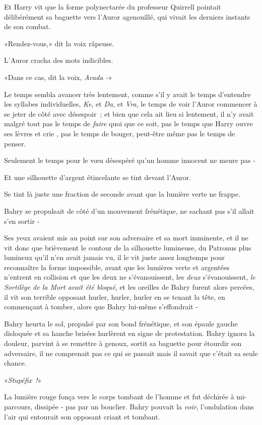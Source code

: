 Et Harry vit que la forme polynectarée du professeur Quirrell pointait délibérément sa baguette vers l'Auror agenouillé, qui vivait les derniers instants de son combat.

«Rendez-vous,» dit la voix râpeuse.

L'Auror cracha des mots indicibles.

«Dans ce cas, dit la voix, \emph{Avada -}»

Le temps sembla avancer très lentement, comme s'il y avait le temps d'entendre les syllabes individuelles, \emph{Ke}, et \emph{Da}, et \emph{Vra}, le temps de voir l'Auror commencer à se jeter de côté avec désespoir~; et bien que cela ait lieu si lentement, il n'y avait malgré tout pas le temps de \emph{faire} quoi que ce soit, pas le temps que Harry ouvre ses lèvres et crie , pas le temps de bouger, peut-être même pas le temps de penser.

Seulement le temps pour le vœu désespéré qu'un homme innocent ne meure pas -

Et une silhouette d'argent étincelante se tint devant l'Auror.

Se tint là juste une fraction de seconde avant que la lumière verte ne frappe.

\later

Bahry se propulsait de côté d'un mouvement frénétique, ne sachant pas s'il allait s'en sortir -

Ses yeux avaient mis au point sur son adversaire et sa mort imminente, et il ne vit donc que brièvement le contour de la silhouette lumineuse, du Patronus plus lumineux qu'il n'en avait jamais vu, il le vit juste assez longtemps pour reconnaître la forme impossible, avant que les lumières verte et argentées n'entrent en collision et que les deux ne s'évanouissent, les \emph{deux} s'évanouissent, \emph{le Sortilège de la Mort avait été bloqué}, et les oreilles de Bahry furent alors percées, il vit son terrible opposant hurler, hurler, hurler en se tenant la tête, en commençant à tomber, alors que Bahry lui-même s'effondrait -

Bahry heurta le sol, propulsé par son bond frénétique, et son épaule gauche disloquée et sa hanche brisées hurlèrent en signe de protestation. Bahry ignora la douleur, parvint à se remettre à genoux, sortit sa baguette pour étourdir son adversaire, il ne comprenait pas ce qui se passait mais il savait que c'était sa seule chance.

«\emph{Stupéfix~!}»

La lumière rouge fonça vers le corps tombant de l'homme et fut déchirée à mi-parcours, dissipée - pas par un bouclier. Bahry pouvait la \emph{voir}, l'ondulation dans l'air qui entourait son opposant criant et tombant.

